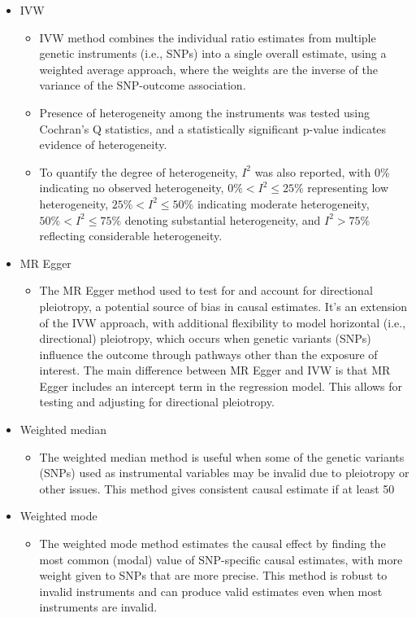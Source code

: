 \documentclass[11pt]{article}
\begin{document}
\begin{itemize}
	\item IVW
		\begin{itemize}
			\item IVW method combines the individual ratio estimates from multiple genetic instruments (i.e., SNPs) into a single overall estimate, using a weighted average approach, where the weights are the inverse of the variance of the SNP-outcome association\cite{burgess2015mendelian}. 
			\item Presence of heterogeneity among the instruments was tested using Cochran's Q statistics, and a statistically significant p-value indicates evidence of heterogeneity\cite{cochran1954combination}. 
			\item To quantify the degree of heterogeneity, \( I^2 \) was also reported, with 0\% indicating no observed heterogeneity, \( 0\% < I^2 \leq 25\% \) representing low heterogeneity, \( 25\% < I^2 \leq 50\% \) indicating moderate heterogeneity, \( 50\% < I^2 \leq 75\% \) denoting substantial heterogeneity, and \( I^2 > 75\% \) reflecting considerable heterogeneity\cite{cochran1954combination}.
		\end{itemize}
	\item MR Egger 
		\begin{itemize}
			\item The MR Egger method used to test for and account for directional pleiotropy, a potential source of bias in causal estimates\cite{burgess2015mendelian}. It's an extension of the IVW approach, with additional flexibility to model horizontal (i.e., directional) pleiotropy, which occurs when genetic variants (SNPs) influence the outcome through pathways other than the exposure of interest\cite{burgess2015mendelian}. The main difference between MR Egger and IVW is that MR Egger includes an intercept term in the regression model. This allows for testing and adjusting for directional pleiotropy\cite{burgess2015mendelian}. 
		\end{itemize}
	\item Weighted median
		\begin{itemize}
			\item The weighted median method is useful when some of the genetic variants (SNPs) used as instrumental variables may be invalid due to pleiotropy or other issues\cite{burgess2015mendelian}. This method gives consistent causal estimate if at least 50%
		\end{itemize}
	\item Weighted mode
		\begin{itemize}
			\item The weighted mode method estimates the causal effect by finding the most common (modal) value of SNP-specific causal estimates, with more weight given to SNPs that are more precise\cite{burgess2015mendelian}. This method is robust to invalid instruments and can produce valid estimates even when most instruments are invalid\cite{burgess2015mendelian}. 
		\end{itemize}
\end{itemize}
\end{document}
